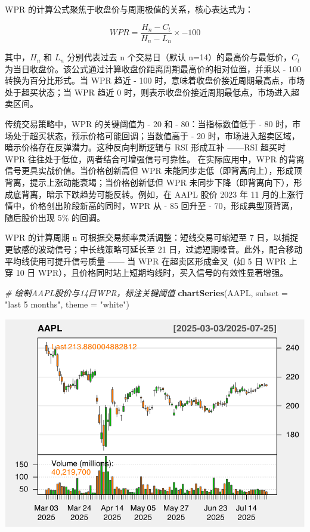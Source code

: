 \documentclass[]{ctexbook}
\newenvironment{Shaded}{\begin{snugshade}}{\end{snugshade}}
\newcommand{\AttributeTok}[1]{\textcolor[rgb]{0.13,0.29,0.53}{#1}}
\newcommand{\CommentTok}[1]{\textcolor[rgb]{0.56,0.35,0.01}{\textit{#1}}}
\newcommand{\FunctionTok}[1]{\textcolor[rgb]{0.13,0.29,0.53}{\textbf{#1}}}
\newcommand{\NormalTok}[1]{#1}
\newcommand{\StringTok}[1]{\textcolor[rgb]{0.31,0.60,0.02}{#1}}
\begin{document}
WPR 的计算公式聚焦于收盘价与周期极值的关系，核心表达式为：

\[WPR = \frac{H_n - C_t}{H_n - L_n} \times -100\]

其中，\(H_n\) 和 \(L_n\) 分别代表过去 n 个交易日（默认 n=14）的最高价与最低价，\(C_t\) 为当日收盘价。该公式通过计算收盘价距离周期最高价的相对位置，并乘以 - 100 转换为百分比形式。当 WPR 趋近 - 100 时，意味着收盘价接近周期最高点，市场处于超买状态；当 WPR 趋近 0 时，则表示收盘价接近周期最低点，市场进入超卖区间。

传统交易策略中，WPR 的关键阈值为 - 20 和 - 80：当指标数值低于 - 80 时，市场处于超买状态，预示价格可能回调；当数值高于 - 20 时，市场进入超卖区域，暗示价格存在反弹潜力。这种反向判断逻辑与 RSI 形成互补 ------RSI 超买时 WPR 往往处于低位，两者结合可增强信号可靠性。
在实际应用中，WPR 的背离信号更具实战价值。当价格创新高但 WPR 未能同步走低（即背离向上），形成顶背离，提示上涨动能衰竭；当价格创新低但 WPR 未同步下降（即背离向下），形成底背离，暗示下跌趋势可能反转。例如，在 AAPL 股价 2023 年 11 月的上涨行情中，价格创出阶段新高的同时，WPR 从 - 85 回升至 - 70，形成典型顶背离，随后股价出现 5\% 的回调。

WPR 的计算周期 n 可根据交易频率灵活调整：短线交易可缩短至 7 日，以捕捉更敏感的波动信号；中长线策略可延长至 21 日，过滤短期噪音。此外，配合移动平均线使用可提升信号质量 ------ 当 WPR 在超卖区形成金叉（如 5 日 WPR 上穿 10 日 WPR），且价格同时站上短期均线时，买入信号的有效性显著增强。

\begin{Shaded}
\begin{Highlighting}[]
\CommentTok{\# 绘制AAPL股价与14日WPR，标注关键阈值}
\FunctionTok{chartSeries}\NormalTok{(AAPL, }\AttributeTok{subset =} \StringTok{"last 5 months"}\NormalTok{, }\AttributeTok{theme =} \StringTok{"white"}\NormalTok{)}
\end{Highlighting}
\end{Shaded}

\includegraphics[width=0.9\linewidth]{QuantmodHandbook_files/figure-latex/wpr-1}
\end{document}
